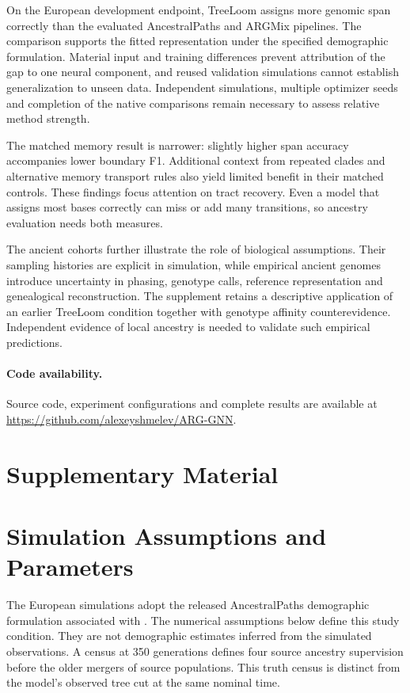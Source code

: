 \documentclass[letterpaper]{article}
\begin{document}
On the European development endpoint, TreeLoom assigns more genomic span correctly than the evaluated AncestralPaths and ARGMix pipelines. The comparison supports the fitted representation under the specified demographic formulation. Material input and training differences prevent attribution of the gap to one neural component, and reused validation simulations cannot establish generalization to unseen data. Independent simulations, multiple optimizer seeds and completion of the native comparisons remain necessary to assess relative method strength.

The matched memory result is narrower: slightly higher span accuracy accompanies lower boundary F1. Additional context from repeated clades and alternative memory transport rules also yield limited benefit in their matched controls. These findings focus attention on tract recovery. Even a model that assigns most bases correctly can miss or add many transitions, so ancestry evaluation needs both measures.

The ancient cohorts further illustrate the role of biological assumptions. Their sampling histories are explicit in simulation, while empirical ancient genomes introduce uncertainty in phasing, genotype calls, reference representation and genealogical reconstruction. The supplement retains a descriptive application of an earlier TreeLoom condition together with genotype affinity counterevidence. Independent evidence of local ancestry is needed to validate such empirical predictions.

\paragraph{Code availability.}
Source code, experiment configurations and complete results are available at \url{https://github.com/alexeyshmelev/ARG-GNN}.



\clearpage
\appendix
\section*{Supplementary Material}

\section{Simulation Assumptions and Parameters}
\label{app:simulation}
The European simulations adopt the released AncestralPaths demographic formulation associated with \citet{eurasians2024}. The numerical assumptions below define this study condition. They are not demographic estimates inferred from the simulated observations. A census at 350 generations defines four source ancestry supervision before the older mergers of source populations. This truth census is distinct from the model's observed tree cut at the same nominal time.
\end{document}
